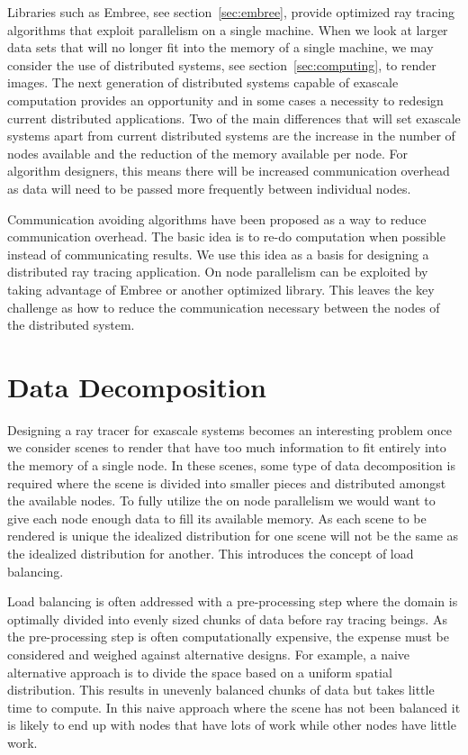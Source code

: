 \label{sec:design}

Libraries such as Embree, see section~\ref{sec:embree}, provide optimized ray 
tracing algorithms that exploit parallelism on a single machine.  When we look
at larger data sets that will no longer fit into the memory of a single machine,
we may consider the use of distributed systems, see section~\ref{sec:computing},
to render images.  The next generation of distributed systems capable of 
exascale computation provides an opportunity and in some cases a necessity to 
redesign current distributed applications.  Two of the main differences that 
will set exascale systems apart from current distributed systems are the 
increase in the number of nodes available and the reduction of the memory 
available per node.  For algorithm designers, this means there will be increased
communication overhead as data will need to be passed more frequently between 
individual nodes.

Communication avoiding algorithms have been proposed as a way to reduce 
communication overhead.  The basic idea is to re-do computation when possible
instead of communicating results.  We use this idea as a basis for designing a 
distributed ray tracing application.  On node parallelism can be exploited by
taking advantage of Embree or another optimized library.  This leaves the key 
challenge as how to reduce the communication necessary between the nodes of the 
distributed system.

\section{Data Decomposition}
\label{sec:data_decomposition}
Designing a ray tracer for exascale systems becomes an interesting problem once
we consider scenes to render that have too much information to fit entirely into
the memory of a single node.  In these scenes, some type of data decomposition 
is required where the scene is divided into smaller pieces and distributed 
amongst the available nodes. To fully utilize the on node parallelism we would 
want to give each node enough data to fill its available memory. As each scene 
to be rendered is unique the idealized distribution for one scene will not be 
the same as the idealized distribution for another.  This introduces the concept 
of load balancing.

Load balancing is often addressed with a pre-processing step where the domain is 
optimally divided into evenly sized chunks of data before ray tracing beings. 
As the pre-processing step is often computationally expensive, the expense must 
be considered and weighed against alternative designs. For example, a naive 
alternative approach is to divide the space based on a uniform spatial 
distribution.  This results in unevenly balanced chunks of data but takes little
time to compute.  In this naive approach where the scene has not been balanced 
it is likely to end up with nodes that have lots of work while other nodes have 
little work.

